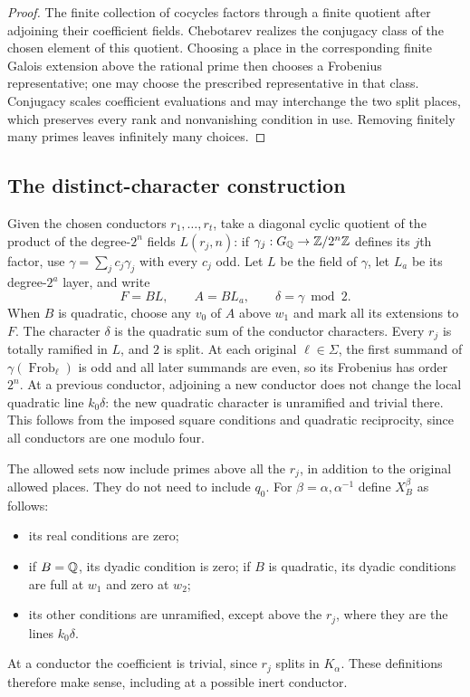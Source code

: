\begin{proof}
The finite collection of cocycles factors through a finite quotient
after adjoining their coefficient fields.  Chebotarev realizes the
conjugacy class of the chosen element of this quotient.  Choosing a
place in the corresponding finite Galois extension above the rational
prime then chooses a Frobenius representative;
one may choose the prescribed representative in that class.
Conjugacy scales coefficient evaluations and may interchange the
two split places, which preserves every rank and nonvanishing
condition in use.  Removing finitely many primes leaves infinitely
many choices.
\end{proof}

\subsection{The distinct-character construction}

Given the chosen conductors $r_1,\ldots,r_t$, take a diagonal cyclic
quotient of the product of the degree-$2^n$ fields $L(r_j,n)$:
if $\gamma_j:G_{\mathbb Q}\to\mathbb Z/2^n\mathbb Z$ defines its $j$th factor,
use $\gamma=\sum_j c_j\gamma_j$ with every $c_j$ odd.  Let $L$
be the field of $\gamma$, let $L_a$ be its degree-$2^a$ layer, and
write
\[
           F=BL,\qquad A=BL_a,\qquad \delta=\gamma\bmod2.
\]
When $B$ is quadratic, choose any $v_0$ of $A$ above $w_1$ and
mark all its extensions to $F$.
The character $\delta$ is the quadratic sum of the conductor
characters.  Every $r_j$ is totally ramified in $L$, and $2$ is
split.  At each original $\ell\in\Sigma$, the first summand of
$\gamma(\operatorname{Frob}_\ell)$ is odd and all later summands
are even, so its Frobenius has order $2^n$.
At a previous conductor, adjoining a new conductor does not change
the local quadratic line $k_0\delta$: the new quadratic character
is unramified and trivial there.  This follows from the imposed
square conditions and quadratic reciprocity, since all conductors
are one modulo four.

The allowed sets now include primes above all the $r_j$, in addition
to the original allowed places.  They do not need to include $q_0$.
For $\beta=\alpha,\alpha^{-1}$ define $X_B^\beta$ as follows:
\begin{itemize}
\item its real conditions are zero;
\item if $B=\mathbb Q$, its dyadic condition is zero; if $B$ is quadratic,
its dyadic conditions are full at $w_1$ and zero at $w_2$;
\item its other conditions are unramified, except above the $r_j$,
where they are the lines $k_0\delta$.
\end{itemize}
At a conductor the coefficient is trivial, since $r_j$ splits in
$K_\alpha$.  These definitions therefore make sense, including at
a possible inert conductor.

